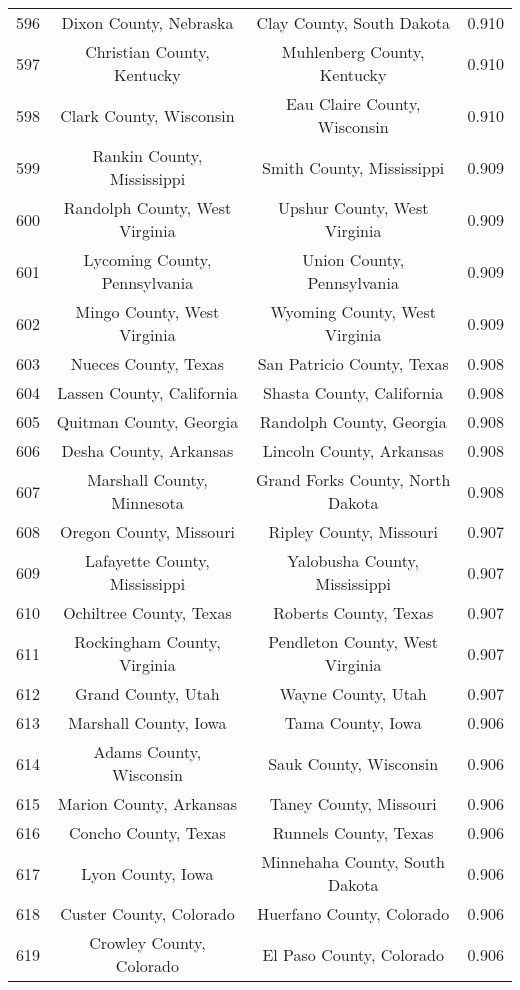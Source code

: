 \begin{longtable}{cccc}
  596 & Dixon County, Nebraska & Clay County, South Dakota & 0.910 \\ 
  597 & Christian County, Kentucky & Muhlenberg County, Kentucky & 0.910 \\ 
  598 & Clark County, Wisconsin & Eau Claire County, Wisconsin & 0.910 \\ 
  599 & Rankin County, Mississippi & Smith County, Mississippi & 0.909 \\ 
  600 & Randolph County, West Virginia & Upshur County, West Virginia & 0.909 \\ 
  601 & Lycoming County, Pennsylvania & Union County, Pennsylvania & 0.909 \\ 
  602 & Mingo County, West Virginia & Wyoming County, West Virginia & 0.909 \\ 
  603 & Nueces County, Texas & San Patricio County, Texas & 0.908 \\ 
  604 & Lassen County, California & Shasta County, California & 0.908 \\ 
  605 & Quitman County, Georgia & Randolph County, Georgia & 0.908 \\ 
  606 & Desha County, Arkansas & Lincoln County, Arkansas & 0.908 \\ 
  607 & Marshall County, Minnesota & Grand Forks County, North Dakota & 0.908 \\ 
  608 & Oregon County, Missouri & Ripley County, Missouri & 0.907 \\ 
  609 & Lafayette County, Mississippi & Yalobusha County, Mississippi & 0.907 \\ 
  610 & Ochiltree County, Texas & Roberts County, Texas & 0.907 \\ 
  611 & Rockingham County, Virginia & Pendleton County, West Virginia & 0.907 \\ 
  612 & Grand County, Utah & Wayne County, Utah & 0.907 \\ 
  613 & Marshall County, Iowa & Tama County, Iowa & 0.906 \\ 
  614 & Adams County, Wisconsin & Sauk County, Wisconsin & 0.906 \\ 
  615 & Marion County, Arkansas & Taney County, Missouri & 0.906 \\ 
  616 & Concho County, Texas & Runnels County, Texas & 0.906 \\ 
  617 & Lyon County, Iowa & Minnehaha County, South Dakota & 0.906 \\ 
  618 & Custer County, Colorado & Huerfano County, Colorado & 0.906 \\ 
  619 & Crowley County, Colorado & El Paso County, Colorado & 0.906 \\ 

\end{longtable}
